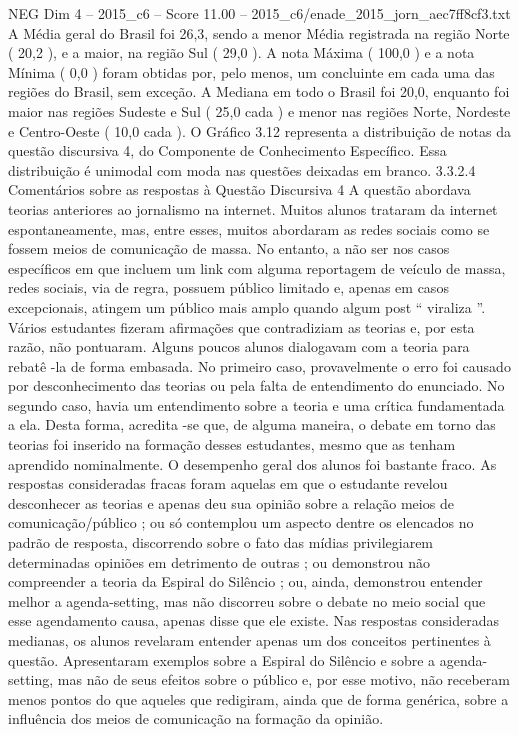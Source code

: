 \begin{textsample}{NEG Dim 4 – 2015\_c6 – Score 11.00 – 2015\_c6/enade\_2015\_jorn\_aec7ff8cf3.txt}
A Média geral do Brasil foi 26,3, sendo a menor Média registrada na região Norte ( 20,2 ), e a maior, na região Sul ( 29,0 ).
A nota Máxima ( 100,0 ) e a nota Mínima ( 0,0 ) foram obtidas por, pelo menos, um concluinte em cada uma das regiões do Brasil, sem exceção.
A Mediana em todo o Brasil foi 20,0, enquanto foi maior nas regiões Sudeste e Sul ( 25,0 cada ) e menor nas regiões Norte, Nordeste e Centro-Oeste ( 10,0 cada ).
O Gráfico 3.12 representa a distribuição de notas da questão discursiva 4, do Componente de Conhecimento Específico.
Essa distribuição é unimodal com moda nas questões deixadas em branco. 3.3.2.4 Comentários sobre as respostas à Questão Discursiva 4 A questão abordava teorias anteriores ao jornalismo na internet.
Muitos alunos trataram da internet espontaneamente, mas, entre esses, muitos abordaram as redes sociais como se fossem meios de comunicação de massa.
No entanto, a não ser nos casos específicos em que incluem um link com alguma reportagem de veículo de massa, redes sociais, via de regra, possuem público limitado e, apenas em casos excepcionais, atingem um público mais amplo quando algum post “ viraliza ”.
Vários estudantes fizeram afirmações que contradiziam as teorias e, por esta razão, não pontuaram.
Alguns poucos alunos dialogavam com a teoria para rebatê -la de forma embasada.
No primeiro caso, provavelmente o erro foi causado por desconhecimento das teorias ou pela falta de entendimento do enunciado.
No segundo caso, havia um entendimento sobre a teoria e uma crítica fundamentada a ela.
Desta forma, acredita -se que, de alguma maneira, o debate em torno das teorias foi inserido na formação desses estudantes, mesmo que as tenham aprendido nominalmente.
O desempenho geral dos alunos foi bastante fraco.
As respostas consideradas fracas foram aquelas em que o estudante revelou desconhecer as teorias e apenas deu sua opinião sobre a relação meios de comunicação/público ; ou só contemplou um aspecto dentre os elencados no padrão de resposta, discorrendo sobre o fato das mídias privilegiarem determinadas opiniões em detrimento de outras ; ou demonstrou não compreender a teoria da Espiral do Silêncio ; ou, ainda, demonstrou entender melhor a agenda-setting, mas não discorreu sobre o debate no meio social que esse agendamento causa, apenas disse que ele existe.
Nas respostas consideradas medianas, os alunos revelaram entender apenas um dos conceitos pertinentes à questão.
Apresentaram exemplos sobre a Espiral do Silêncio e sobre a agenda-setting, mas não de seus efeitos sobre o público e, por esse motivo, não receberam menos pontos do que aqueles que redigiram, ainda que de forma genérica, sobre a influência dos meios de comunicação na formação da opinião.

\end{textsample}
